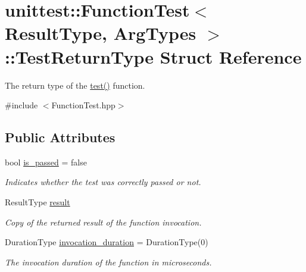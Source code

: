 \hypertarget{structunittest_1_1_function_test_1_1_test_return_type}{}\section{unittest\+:\+:Function\+Test$<$ Result\+Type, Arg\+Types $>$\+:\+:Test\+Return\+Type Struct Reference}
\label{structunittest_1_1_function_test_1_1_test_return_type}


The return type of the \hyperlink{classunittest_1_1_function_test_a25ae63b50e7339b313ed11e0ba1e02dc}{test()} function.  




{\ttfamily \#include $<$Function\+Test.\+hpp$>$}

\subsection*{Public Attributes}
\begin{DoxyCompactItemize}
\item 
bool \hyperlink{structunittest_1_1_function_test_1_1_test_return_type_a51c06dbf82dad530855abb24529896d3}{is\+\_\+passed} = false\hypertarget{structunittest_1_1_function_test_1_1_test_return_type_a51c06dbf82dad530855abb24529896d3}{}\label{structunittest_1_1_function_test_1_1_test_return_type_a51c06dbf82dad530855abb24529896d3}

\begin{DoxyCompactList}\small\item\em Indicates whether the test was correctly passed or not. \end{DoxyCompactList}\item 
Result\+Type \hyperlink{structunittest_1_1_function_test_1_1_test_return_type_af0b1e5518ee3ba8fa43aafdc01121e83}{result}\hypertarget{structunittest_1_1_function_test_1_1_test_return_type_af0b1e5518ee3ba8fa43aafdc01121e83}{}\label{structunittest_1_1_function_test_1_1_test_return_type_af0b1e5518ee3ba8fa43aafdc01121e83}

\begin{DoxyCompactList}\small\item\em Copy of the returned result of the function invocation. \end{DoxyCompactList}\item 
Duration\+Type \hyperlink{structunittest_1_1_function_test_1_1_test_return_type_a4c8edd888a5c8ffb260323d76d8195cb}{invocation\+\_\+duration} = Duration\+Type(0)\hypertarget{structunittest_1_1_function_test_1_1_test_return_type_a4c8edd888a5c8ffb260323d76d8195cb}{}\label{structunittest_1_1_function_test_1_1_test_return_type_a4c8edd888a5c8ffb260323d76d8195cb}

\begin{DoxyCompactList}\small\item\em The invocation duration of the function in microseconds. \end{DoxyCompactList}\end{DoxyCompactItemize}


